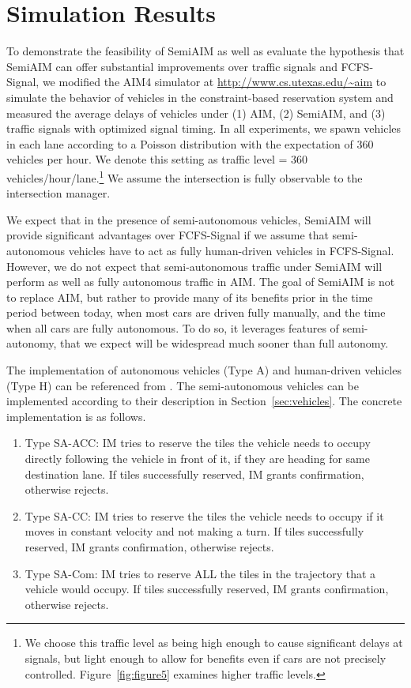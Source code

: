 \section{Simulation Results}
\label{sec:simulation}

To demonstrate the feasibility of SemiAIM as well as evaluate the
hypothesis that SemiAIM can offer substantial improvements over
traffic signals and FCFS-Signal, we modified the AIM4 simulator at
\url{http://www.cs.utexas.edu/~aim} to simulate the behavior of
vehicles in the constraint-based reservation system and measured the
average delays of vehicles under (1) AIM, (2) SemiAIM, and (3) traffic
signals with optimized signal timing. In all experiments,
we spawn vehicles in each lane according to a Poisson distribution with the
expectation of 360 vehicles per hour. We denote this setting as
traffic level = 360 vehicles/hour/lane.\footnote{We choose this
traffic level as being high enough to cause significant delays at
signals, but light enough to allow for benefits even if cars are not
precisely controlled. Figure~\ref{fig:figure5} examines higher traffic
levels.} We assume the intersection is fully observable to the intersection
manager.

We expect that in the presence of semi-autonomous vehicles, SemiAIM
will provide significant advantages over FCFS-Signal if we assume that
semi-autonomous vehicles have to act as fully human-driven vehicles in
FCFS-Signal.  However, we do not expect that semi-autonomous traffic
under SemiAIM will perform as well as fully autonomous traffic in AIM.
The goal of SemiAIM is not to replace AIM, but rather to provide many
of its benefits prior in the time period between today, when most cars
are driven fully manually, and the time when all cars are fully
autonomous.  To do so, it leverages features of semi-autonomy, that we
expect will be widespread much sooner than full autonomy.

The implementation of autonomous vehicles (Type A) and human-driven
vehicles (Type H) can be referenced from
\cite{bib:Dresner08Multiagent}. The semi-autonomous vehicles can be
implemented according to their description in
Section~\ref{sec:vehicles}. The concrete implementation is as follows.

\begin{enumerate}

\item{Type SA-ACC: IM tries to reserve the tiles the vehicle needs to
occupy directly following the vehicle in front of it, if they are
heading for same destination lane. If tiles successfully reserved,
IM grants confirmation, otherwise rejects.}

\item{Type SA-CC: IM tries to reserve the tiles the vehicle needs to
occupy if it moves in constant velocity and not making a turn. If
tiles successfully reserved, IM grants confirmation, otherwise
rejects.}
 
\item{Type SA-Com: IM tries to reserve ALL the tiles in the trajectory
that a vehicle would occupy. If tiles successfully reserved, IM
grants confirmation, otherwise rejects.}

\end{enumerate}

